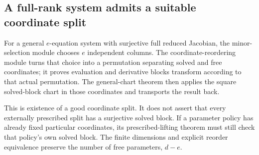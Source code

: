 \subsection{A full-rank system admits a suitable coordinate split}
For a general $e$-equation system with surjective full reduced Jacobian, the minor-selection module chooses $e$ independent columns. The coordinate-reordering module turns that choice into a permutation separating solved and free coordinates; it proves evaluation and derivative blocks transform according to that actual permutation. The general-chart theorem then applies the square solved-block chart in those coordinates and transports the result back.

This is existence of a good coordinate split. It does not assert that every externally prescribed split has a surjective solved block. If a parameter policy has already fixed particular coordinates, its prescribed-lifting theorem must still check that policy's own solved block. The finite dimensions and explicit reorder equivalence preserve the number of free parameters, $d-e$.
